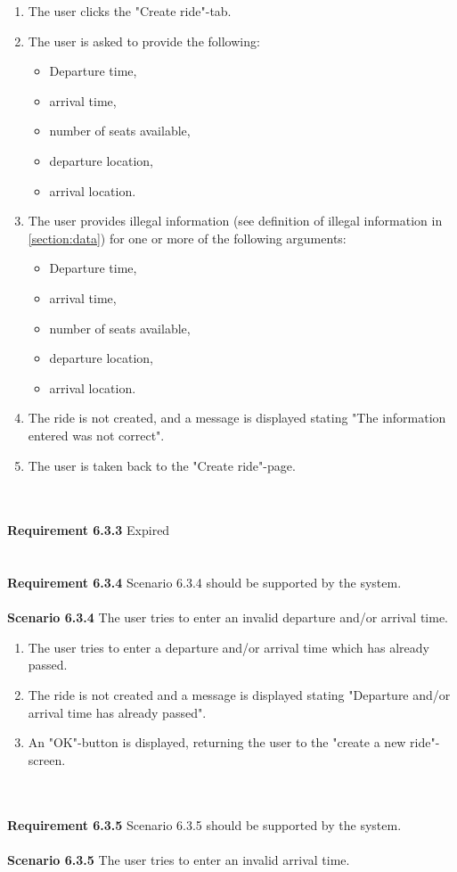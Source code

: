 \documentclass{article}
\begin{document}
\begin{enumerate}
    \item The user clicks the "Create ride"-tab.
    \item The user is asked to provide the following:
        \begin{itemize}
            \item Departure time,
            \item arrival time, 
            \item number of seats available, 
            \item departure location,
            \item arrival location. 
        \end{itemize}
    \item The user provides illegal information (see definition of illegal information in \ref{section:data})  for one or more of the following arguments:
            \begin{itemize}
            \item Departure time,
            \item arrival time, 
            \item number of seats available, 
            \item departure location,
            \item arrival location. 
        \end{itemize}
    \item The ride is not created, and a message is displayed stating "The information entered was not correct".  
    \item The user is taken back to the "Create ride"-page.
    
\end{enumerate}
\mbox{}\\ \\
\textbf{Requirement 6.3.3} Expired \\
\mbox{}\\ \\
\textbf{Requirement 6.3.4} Scenario 6.3.4 should be supported by the system.
\\ \\
\textbf{Scenario 6.3.4} The user tries to enter an invalid departure and/or arrival time.

\begin{enumerate}
    \item The user tries to enter a departure and/or arrival time which has already passed.
    \item The ride is not created and a message is displayed stating "Departure and/or arrival time has already passed".
    \item An "OK"-button is displayed, returning the user to the "create a new ride"-screen.
\end{enumerate}
\mbox{}\\ \\
\textbf{Requirement 6.3.5} Scenario 6.3.5 should be supported by the system.
\\ \\
\textbf{Scenario 6.3.5} The user tries to enter an invalid arrival time.
\end{document}
